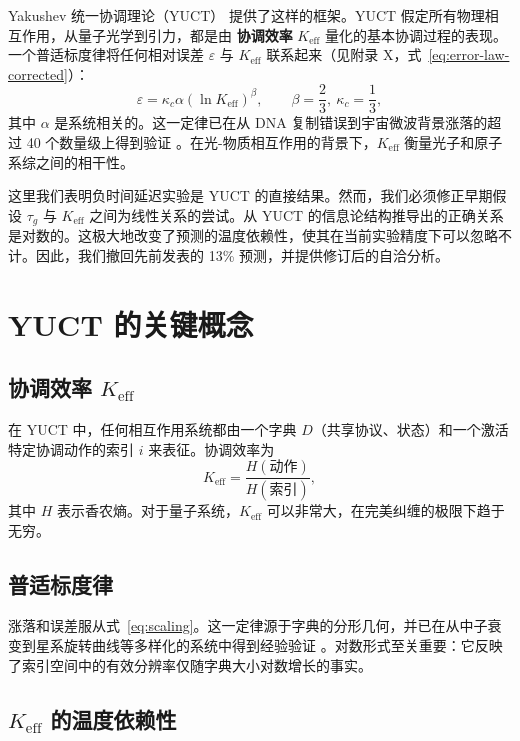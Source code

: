 \documentclass[12pt,a4paper]{article}
\newcommand{\Keff}{K_{\mathrm{eff}}}
\newcommand{\kappac}{\kappa_c}
\newcommand{\eps}{\varepsilon}
\newcommand{\betac}{\beta}
\begin{document}
	Yakushev 统一协调理论（YUCT）\cite{Yakushev2026a} 提供了这样的框架。YUCT 假定所有物理相互作用，从量子光学到引力，都是由 \textbf{协调效率} \(\Keff\) 量化的基本协调过程的表现。一个普适标度律将任何相对误差 \(\eps\) 与 \(\Keff\) 联系起来（见附录 X，式~\ref{eq:error-law-corrected}）：
	\begin{equation}
		\eps = \kappac \alpha (\ln\Keff)^{\betac}, \qquad \betac = \frac{2}{3},\ \kappac = \frac{1}{3},
		\label{eq:scaling}
	\end{equation}
	其中 \(\alpha\) 是系统相关的。这一定律已在从 DNA 复制错误到宇宙微波背景涨落的超过 40 个数量级上得到验证 \cite{Yakushev2026c}。在光-物质相互作用的背景下，\(\Keff\) 衡量光子和原子系综之间的相干性。
	
	这里我们表明负时间延迟实验是 YUCT 的直接结果。然而，我们必须修正早期假设 \(\tau_g\) 与 \(\Keff\) 之间为线性关系的尝试。从 YUCT 的信息论结构推导出的正确关系是对数的。这极大地改变了预测的温度依赖性，使其在当前实验精度下可以忽略不计。因此，我们撤回先前发表的 13\% 预测，并提供修订后的自洽分析。
	
	\section{YUCT 的关键概念}
	
	\subsection{协调效率 \(\Keff\)}
	
	在 YUCT 中，任何相互作用系统都由一个字典 \(D\)（共享协议、状态）和一个激活特定协调动作的索引 \(i\) 来表征。协调效率为
	\begin{equation}
		\Keff = \frac{H(\text{动作})}{H(\text{索引})},
	\end{equation}
	其中 \(H\) 表示香农熵。对于量子系统，\(\Keff\) 可以非常大，在完美纠缠的极限下趋于无穷。
	
	\subsection{普适标度律}
	
	涨落和误差服从式~\eqref{eq:scaling}。这一定律源于字典的分形几何，并已在从中子衰变到星系旋转曲线等多样化的系统中得到经验验证 \cite{Yakushev2026c}。对数形式至关重要：它反映了索引空间中的有效分辨率仅随字典大小对数增长的事实。
	
	\subsection{\(\Keff\) 的温度依赖性}
	
\end{document}
